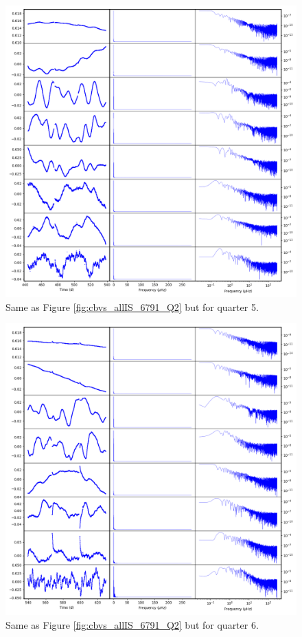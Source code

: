 \begin{figure}
    \centering
    \includegraphics[width=\linewidth]{Chapter_Appended/AppB/cbv_6791_q05.png}
    \caption{Same as Figure \ref{fig:cbvs_allIS_6791_Q2} but for quarter 5.}
    \label{fig:cbvs_allIS_6791_Q05}
\end{figure}


\begin{figure}
    \centering
    \includegraphics[width=\linewidth]{Chapter_Appended/AppB/cbv_6791_q06.png}
    \caption{Same as Figure \ref{fig:cbvs_allIS_6791_Q2} but for quarter 6.}
    \label{fig:cbvs_allIS_6791_Q06}
\end{figure}


